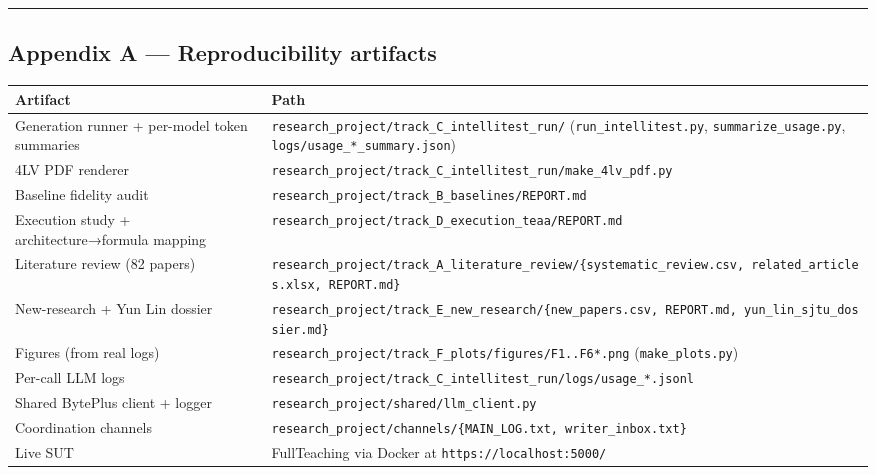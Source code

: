 \documentclass[
]{article}
\newcounter{none} %
\begin{document}
\begin{center}\rule{0.5\linewidth}{0.5pt}\end{center}

\subsection{Appendix A --- Reproducibility
artifacts}\label{appendix-a-reproducibility-artifacts}

{\def\LTcaptype{none} %
\begin{longtable}[]{@{}
  >{\raggedright\arraybackslash}p{}
  >{\raggedright\arraybackslash}p{}@{}}
\toprule\noalign{}
\begin{minipage}[b]{\linewidth}\raggedright
Artifact
\end{minipage} & \begin{minipage}[b]{\linewidth}\raggedright
Path
\end{minipage} \\
\midrule\noalign{}
\endhead
\bottomrule\noalign{}
\endlastfoot
Generation runner + per-model token summaries &
\texttt{research\_project/track\_C\_intellitest\_run/}
(\texttt{run\_intellitest.py}, \texttt{summarize\_usage.py},
\texttt{logs/usage\_*\_summary.json}) \\
4LV PDF renderer &
\texttt{research\_project/track\_C\_intellitest\_run/make\_4lv\_pdf.py} \\
Baseline fidelity audit &
\texttt{research\_project/track\_B\_baselines/REPORT.md} \\
Execution study + architecture→formula mapping &
\texttt{research\_project/track\_D\_execution\_teaa/REPORT.md} \\
Literature review (82 papers) &
\texttt{research\_project/track\_A\_literature\_review/\{systematic\_review.csv,\ related\_articles.xlsx,\ REPORT.md\}} \\
New-research + Yun Lin dossier &
\texttt{research\_project/track\_E\_new\_research/\{new\_papers.csv,\ REPORT.md,\ yun\_lin\_sjtu\_dossier.md\}} \\
Figures (from real logs) &
\texttt{research\_project/track\_F\_plots/figures/F1..F6*.png}
(\texttt{make\_plots.py}) \\
Per-call LLM logs &
\texttt{research\_project/track\_C\_intellitest\_run/logs/usage\_*.jsonl} \\
Shared BytePlus client + logger &
\texttt{research\_project/shared/llm\_client.py} \\
Coordination channels &
\texttt{research\_project/channels/\{MAIN\_LOG.txt,\ writer\_inbox.txt\}} \\
Live SUT & FullTeaching via Docker at
\texttt{https://localhost:5000/} \\
\end{longtable}
}
\end{document}
